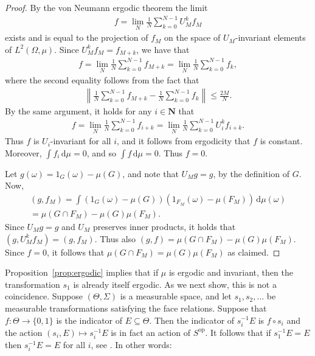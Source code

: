 \documentclass[12pt, pdflatex]{amsart}
\theoremstyle{definition}
\numberwithin{equation}{section}
\numberwithin{theorem}{section}
\newcommand{\NN}{\mathbf{N}}
\def\dd{\mathrm{d}}
\begin{document}
\begin{proof}
    By the von Neumann ergodic theorem the limit
    \begin{align*}
      f = \lim_N \frac{1}{N}\sum_{k=0}^{N-1} U_M^k f_M
    \end{align*}
    exists and is equal to the projection of $f_M$ on the space of $U_M$-invariant elements of $L^2(\Omega,\mu)$. Since $U_M^k f_M = f_{M+k}$, we have that
    \begin{align*}
      f = \lim_N \frac{1}{N}\sum_{k=0}^{N-1} f_{M+k} = \lim_N \frac{1}{N}\sum_{k=0}^{N-1} f_{k},
    \end{align*}
    where the second equality follows from the fact that
    \begin{align*}
      \left\| \frac{1}{N}\sum_{k=0}^{N-1} f_{M+k} - \frac{1}{N}\sum_{k=0}^{N-1} f_{k} \right\| \leq \frac{2M}{N}.
    \end{align*}
    By the same argument, it holds for any $i \in \NN$ that
    \begin{align*}
      f = \lim_N \frac{1}{N}\sum_{k=0}^{N-1} f_{i+k} = \lim_N \frac{1}{N}\sum_{k=0}^{N-1} U_i^kf_{i+k}.
    \end{align*}
    Thus $f$ is $U_i$-invariant for all $i$, and it follows from ergodicity that $f$ is constant. Moreover, $\int f_{i}\,\dd\mu = 0$, and so $\int f\,\dd\mu = 0$. Thus $f=0$.

    Let $g(\omega) = 1_G(\omega)-\mu(G)$, and note that $U_Mg=g$, by the definition of $G$. Now,
    \begin{multline*}
      (g,f_M) = \int (1_G(\omega)-\mu(G))(1_{F_M}(\omega) - \mu(F_M))\,\dd\mu(\omega)\\
      = \mu(G \cap F_M) - \mu(G)\mu(F_M).
    \end{multline*}
    Since $U_M g = g$ and $U_M$ preserves inner products, it holds that $(g,U_M^kf_M) = (g,f_M)$. Thus also $(g,f)=\mu(G \cap F_M) - \mu(G)\mu(F_M)$. Since $f=0$, it follows that $\mu(G \cap F_M) = \mu(G)\mu(F_M)$ as claimed.
\end{proof}

Proposition~\ref{prop:ergodic} implies that if $\mu$ is ergodic and invariant, then the transformation $s_1$ is already itself ergodic. As we next show, this is not a coincidence. Suppose $(\Theta,\Sigma)$ is a measurable space, and let $s_1,s_2,\ldots$ be measurable transformations satisfying the face relations. Suppose that $f \colon \Theta \to \{0,1\}$ is the indicator of $E \subseteq \Theta$. Then the indicator of $s_i^{-1}E$ is $f \circ s_i$ and the action $(s_i,E) \mapsto s_i^{-1}E$ is in fact an action of $S^\mathrm{op}$. It follows that if $s_1^{-1}E=E$ then $s_i^{-1}E=E$ for all $i$, see . In other words:
\end{document}

